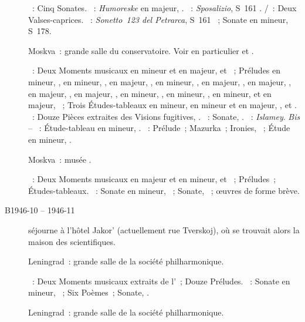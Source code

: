 \begin{description}
 \textsc{\Scarlatti{}}~: Cinq Sonates.
 \textsc{\Schumann{}}~: \emph{Humoreske} en \kB \Flat majeur, .
 \textsc{\Liszt{}}~: \emph{Sposalizio}, S~161 .
 \textsc{\Schubert{}/\Liszt{}}~: Deux Valses-caprices.
 \textsc{\Liszt{}}~: \emph{Sonetto~123 del Petrarca}, S~161 ~;
 Sonate en \kB mineur, S~178.
 \item[\DateWithWeekDay{1946-11-18}]
 Moskva~: grande salle du conservatoire.
 Voir en particulier \citet[p.~443]{Milshteyn82a} et
 \citet[p.~395]{Nikonovich08}.

 \textsc{\Rachmaninov{}}~: Deux Moments musicaux en \kB mineur et en \kD
 \Flat majeur,   et ~; Préludes en \kC \Sharp
 mineur,  , en \kF \Sharp mineur,  , en
 \kD majeur,  , en \kC mineur,  , en
 \kA \Flat majeur,  , en \kE \Flat majeur, 
 , en \kE majeur,  , en \kG majeur, 
 , en \kA mineur,  , en \kG \Sharp mineur,
  , en \kE \Flat mineur,   et en \kB
 \Flat majeur,  ~; Trois Études-tableaux en \kG mineur,
 en \kB mineur et en \kE \Flat majeur,  , 
  et  .
 \textsc{\Prokofiev{}}~: Douze Pièces extraites des Visions fugitives,
 .
 \textsc{\Scriabine{}}~: Sonate, .
 \textsc{\Balakirev{}}~: \emph{Islamey}.
 \emph{Bis} -- \textsc{\Rachmaninov{}}~: Étude-tableau en \kB mineur,
  .
 \textsc{\Scriabine{}}~: Prélude~; Mazurka~; Ironies,  ~;
 Étude en \kD \Sharp mineur,  .
 \item[\DateWithWeekDay{1946-11-24}]
 Moskva~: musée \Scriabine{}.

 \textsc{\Rachmaninov{}}~: Deux Moments musicaux en \kD \Flat majeur et en
 \kB mineur,   et ~; Préludes~;
 Études-tableaux.
 \textsc{\Scriabine{}}~: Sonate en \kF \Sharp mineur, ~; Sonate,
 ~; œuvres de forme brève.
 \item[B1946-10 -- 1946-11]
 \VSofronitsky{} séjourne à l'hôtel Jakor' (actuellement rue Tverskoj), où
 se trouvait alors la maison des scientifiques.
 \item[\DateWithWeekDay{1946-12-16}]
 Leningrad~: grande salle de la société philharmonique.

 \textsc{\Rachmaninov{}}~: Deux Moments musicaux extraits de l'~;
 Douze Préludes.
 \textsc{\Scriabine{}}~: Sonate en \kF \Sharp mineur, ~; Six
 Poèmes~; Sonate, .
 \item[\DateWithWeekDay{1946-12-17}]
 Leningrad~: grande salle de la société philharmonique.


\end{description}
